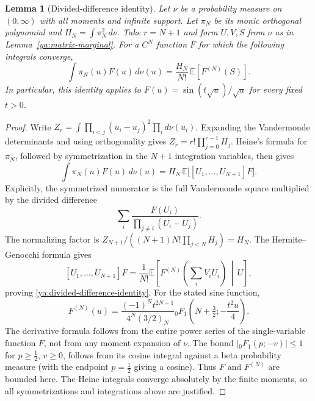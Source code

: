 \documentclass[11pt,a4paper]{article}
\newtheorem{lemma}[theorem]{Lemma}
\theoremstyle{definition}
\theoremstyle{remark}
\numberwithin{equation}{section}
\begin{document}
\begin{lemma}[Divided-difference identity]\label{ya:divided-difference}
Let $\nu$ be a probability measure on $(0,\infty)$ with all moments
and infinite support. Let $\pi_N$ be its monic orthogonal polynomial
and $H_N=\int\pi_N^2\,d\nu$. Take $r=N+1$ and form $U,V,S$ from
$\nu$ as in Lemma~\ref{ya:matrix-marginal}.
For a $C^N$ function $F$ for which the following integrals converge,
\begin{equation}\label{ya:divided-difference-identity}
 \int\pi_N(u)F(u)\,d\nu(u)
       =\frac{H_N}{N!}\,\mathbb E[F^{(N)}(S)].
\end{equation}
In particular, this identity applies to
$F(u)=\sin(t\sqrt u)/\sqrt u$ for every fixed $t>0$.
\end{lemma}
\begin{proof}
Write $Z_r=\int\prod_{i<j}(u_i-u_j)^2\prod_i d\nu(u_i)$.
Expanding the Vandermonde determinants and using orthogonality gives
$Z_r=r!\prod_{j=0}^{r-1}H_j$. Heine's formula for $\pi_N$, followed
by symmetrization in the $N+1$ integration variables, then gives
\[
 \int\pi_N(u)F(u)\,d\nu(u)
       =H_N\,\mathbb E\bigl[[U_1,\ldots,U_{N+1}]F\bigr].
\]
Explicitly, the symmetrized numerator is the full Vandermonde square
multiplied by the divided difference
\[
 \sum_i\frac{F(U_i)}{\prod_{j\ne i}(U_i-U_j)}.
\] The normalizing factor is
$Z_{N+1}/((N+1)N!\prod_{j<N}H_j)=H_N$.
The Hermite--Genocchi formula gives
\[
 [U_1,\ldots,U_{N+1}]F
 =\frac1{N!}\mathbb E\left[
 F^{(N)}\left(\sum_iV_iU_i\right)\,\middle|\,U\right],
\]
proving \eqref{ya:divided-difference-identity}.
For the stated sine function,
\begin{equation}\label{ya:bessel-derivative}
 F^{(N)}(u)
 =\frac{(-1)^Nt^{2N+1}}{4^N(3/2)_N}
       {}_0F_1\left(N+\tfrac32;-\frac{t^2u}{4}\right).
\end{equation}
The derivative formula follows from the entire power series of the
single-variable function $F$, not from any moment expansion of
$\nu$. The bound
$|{}_0F_1(p;-v)|\le1$ for $p\ge\tfrac12$, $v\ge0$, follows from
its cosine integral against a beta probability measure (with the
endpoint $p=\tfrac12$ giving a cosine). Thus $F$ and $F^{(N)}$ are
bounded here. The Heine integrals converge absolutely by the finite
moments, so all symmetrizations and integrations above are justified.
\end{proof}
\end{document}
